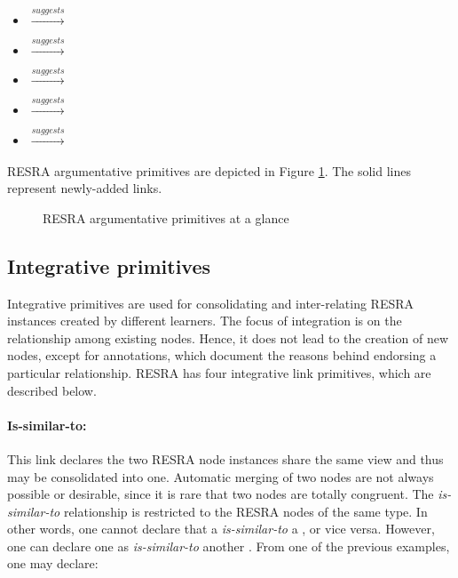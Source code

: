 \begin{itemize}
{\begin{itemize}
   \item {} \( \stackrel{suggests}{\longrightarrow} \)
  
 \item {} \( \stackrel{suggests}{\longrightarrow} \)

 \item {} \( \stackrel{suggests}{\longrightarrow} \)

   \item {} \( \stackrel{suggests}{\longrightarrow} \)

\item {} \( \stackrel{suggests}{\longrightarrow} \)
\end{itemize}


\paragraph{}RESRA argumentative primitives are depicted in Figure
\ref{fig:arg-resra}. The solid lines represent newly-added links.

\begin{figure}[htb]
  \caption{RESRA argumentative primitives at a glance}
  \label{fig:arg-resra}
\end{figure}


\subsection{Integrative primitives}
\label{sec:integrative primitives}

Integrative primitives are used for consolidating and inter-relating RESRA
instances created by different learners. The focus of integration is on the
relationship among existing nodes. Hence, it does not lead to the creation
of new nodes, except for annotations, which document the reasons behind
endorsing a particular relationship. RESRA has four integrative link
primitives, which are described below.

\paragraph{Is-similar-to:}

This link declares the two RESRA node instances share the same view and
thus may be consolidated into one. Automatic merging of two nodes are not
always possible or desirable, since it is rare that two nodes are totally
congruent. The {\it is-similar-to\/} relationship is restricted to the
RESRA nodes of the same type. In other words, one cannot declare that a
 {\it is-similar-to\/} a , or vice
versa.  However, one can declare one  as {\it
is-similar-to\/} another . From one of the
previous examples, one may declare:

}
\end{itemize}
